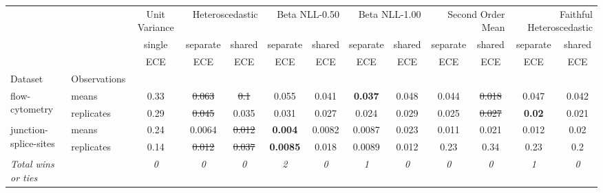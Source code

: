 \begin{tabular}{ll|c|cc|cc|cc|cc|cc}
\toprule
{} & {} & {Unit Variance} & \multicolumn{2}{r}{Heteroscedastic} & \multicolumn{2}{r}{Beta NLL-0.50} & \multicolumn{2}{r}{Beta NLL-1.00} & \multicolumn{2}{r}{Second Order Mean} & \multicolumn{2}{r}{Faithful Heteroscedastic} \\
{} & {} & {single} & {separate} & {shared} & {separate} & {shared} & {separate} & {shared} & {separate} & {shared} & {separate} & {shared} \\
{} & {} & {ECE} & {ECE} & {ECE} & {ECE} & {ECE} & {ECE} & {ECE} & {ECE} & {ECE} & {ECE} & {ECE} \\
{Dataset} & {Observations} & {} & {} & {} & {} & {} & {} & {} & {} & {} & {} & {} \\
\midrule
\multirow[c]{2}{*}{flow-cytometry} & means & 0.33 & \sout{0.063} & \sout{0.1} & 0.055 & 0.041 & \textbf{0.037} & 0.048 & 0.044 & \sout{0.018} & 0.047 & 0.042 \\
 & replicates & 0.29 & \sout{0.045} & 0.035 & 0.031 & 0.027 & 0.024 & 0.029 & 0.025 & \sout{0.027} & \textbf{0.02} & 0.021 \\
\multirow[c]{2}{*}{junction-splice-sites} & means & 0.24 & 0.0064 & \sout{0.012} & \textbf{0.004} & 0.0082 & 0.0087 & 0.023 & 0.011 & 0.021 & 0.012 & 0.02 \\
 & replicates & 0.14 & \sout{0.012} & \sout{0.037} & \textbf{0.0085} & 0.018 & 0.0089 & 0.012 & 0.23 & 0.34 & 0.23 & 0.2 \\
\textit{{Total wins or ties}} &  & \textit{0} & \textit{0} & \textit{0} & \textit{2} & \textit{0} & \textit{1} & \textit{0} & \textit{0} & \textit{0} & \textit{1} & \textit{0} \\
\bottomrule
\end{tabular}
